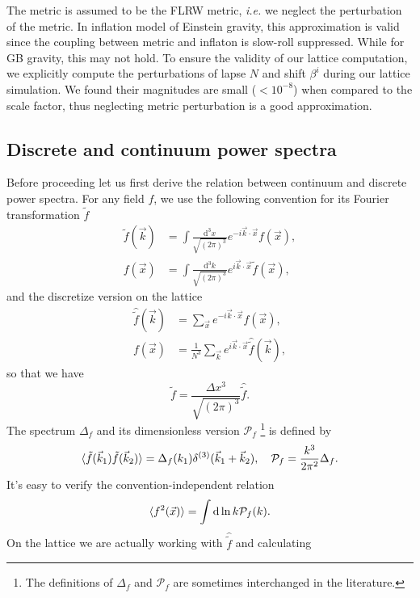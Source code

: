 \documentclass[reprint, 10pt, amsmath, amssymb, floatfix, aps, prd, superscriptaddress, nofootinbib, nobibnotes,twocolumn]{revtex4-1}
\def\dd{{\mathrm{d}}}
\begin{document}
The metric is assumed to be the FLRW metric, \textit{i.e.} we neglect the perturbation of the metric. In inflation model of Einstein gravity, this approximation is valid since the coupling between metric and inflaton is slow-roll suppressed. While for GB gravity, this may not hold. To ensure the validity of our lattice computation, we explicitly compute the perturbations of lapse $N$ and shift $\beta^i$ during our lattice simulation. We found their magnitudes are small ($< 10^{-8}$) when compared to the scale factor, thus neglecting metric perturbation is a good approximation.

\subsection{Discrete and continuum power spectra}
Before proceeding let us first derive the relation between continuum and discrete power spectra. For any field $f$, we use the following convention for its Fourier transformation $\tilde f$
\begin{align}
	\tilde f(\vec k) & = \int\frac{\dd^3x}{\sqrt{(2\pi)^3}} e^{-i\vec k\cdot\vec x}f(\vec x),\\
	f(\vec x) & = \int\frac{\dd^3k}{\sqrt{(2\pi)^3}} e^{i\vec k\cdot\vec x}\tilde f(\vec x),
\end{align}
and the discretize version on the lattice
\begin{align}
	\hat{\tilde f}(\vec k) & = \sum_{\vec x} e^{-i\vec k\cdot\vec x}f(\vec x),\\
	f(\vec x) & = \frac{1}{N^3}\sum_{\vec k} e^{i\vec k\cdot\vec x}\hat{\tilde f}(\vec k),
\end{align}
so that we have
\begin{equation}\label{eq:f-hat-f-relation}
    \tilde f = \frac{\Delta x^3}{\sqrt{(2\pi)^3}}\hat{\tilde f}.
\end{equation}
The spectrum $\Delta_f$ and its dimensionless version $\mathcal P_f$ \footnote{The definitions of $\Delta_f$ and $\mathcal P_f$ are sometimes interchanged in the literature.} is defined by
\begin{equation}
	\braket{\tilde f(\vec k_1)\tilde f(\vec k_2)} = \Delta_f(k_1) \delta^{(3)}(\vec k_1 + \vec k_2), \quad \mathcal P_f = \frac{k^3}{2\pi^2}\Delta_f.
\end{equation}
It's easy to verify the convention-independent relation
\begin{equation}
	\braket{f^2(\vec x)} = \int\dd\ln k \mathcal P_f(k).
\end{equation}
On the lattice we are actually working with $\hat{\tilde f}$ and calculating
\end{document}
